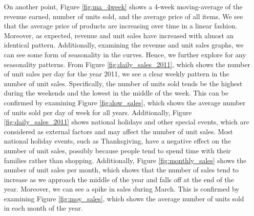 On another point, Figure \ref{fig:ma_4week} shows a 4-week moving-average of the revenue earned, number of units sold, and the average price of all items.
We see that the average price of products are increasing over time in a linear fashion. Moreover, as expected, revenue and unit sales have increased with almost an identical pattern. Additionally, examining the revenue and unit sales graphs, we can see some form of seasonality in the curves.
Hence, we further explore for any seasonality patterns. From Figure \ref{fig:daily_sales_2011}, which shows the number of unit sales per day for the year 2011, we see a clear weekly pattern in the number of unit sales.
Specifically, the number of units sold tends be the highest during the weekends and the lowest in the middle of the week. 
This can be confirmed by examining Figure \ref{fig:dow_sales}, which shows the average number of units sold per day of week for all years.
Additionally, Figure \ref{fig:daily_sales_2011} shows national holidays and other special events, which are considered as external factors and may affect the number of unit sales. 
Most national holiday events, such as Thanksgiving, have a negative effect on the number of unit sales, possibly because people tend to spend time with their families rather than shopping. 
Additionally, Figure \ref{fig:monthly_sales} shows the number of unit sales per month, which shows that the number of sales tend to increase as we approach the middle of the year and falls off at the end of the year.
Moreover, we can see a spike in sales during March.
This is confirmed by examining Figure \ref{fig:moy_sales}, which shows the average number of units sold in each month of the year. 

